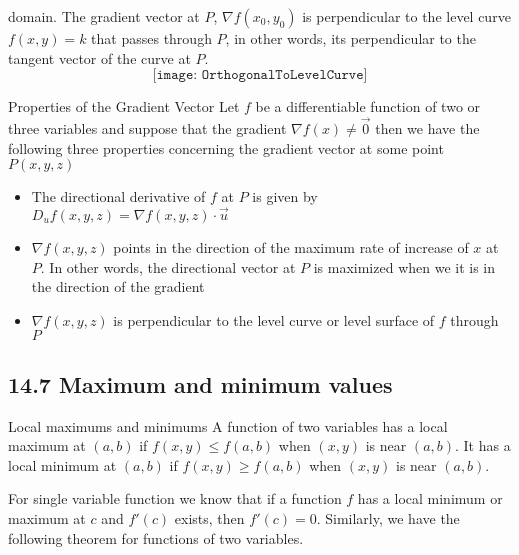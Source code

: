 \documentclass{article}
\begin{document}
	domain. The gradient vector at $P$, $\nabla f(x_{0},y_{0})$ is perpendicular to
	the level curve $f(x,y) = k$ that passes through $P$, in other words, its perpendicular
	to the tangent vector of the curve at $P$.
	\[
		\texttt{[image: OrthogonalToLevelCurve]}
	\]
	\pagebreak
	\begin{mybox}
		{Properties of the Gradient Vector} Let $f$ be a differentiable function of two
		or three variables and suppose that the gradient $\nabla f(x) \not = \vec{0}$
		then we have the following three properties concerning the gradient vector at
		some point $P(x,y,z)$
		\begin{itemize}
			\item The directional derivative of $f$ at $P$ is given by $D_{u}f(x,y,z)=
				\nabla f(x,y,z) \cdot \vec{u}$

			\item $\nabla f(x,y,z)$ points in the direction of the maximum rate of increase
				of $x$ at $P$. In other words, the directional vector at $P$ is maximized
				when we it is in the direction of the gradient

			\item $\nabla f(x,y,z)$ is perpendicular to the level curve or level surface
				of $f$ through $P$
		\end{itemize}
	\end{mybox}
	\subsection{14.7 Maximum and minimum values}
	\begin{mybox}
		{Local maximums and minimums} A function of two variables has a local maximum
		at $(a,b)$ if $f(x,y) \leq f(a,b)$ when $(x,y)$ is near $(a,b)$. It has a
		local minimum at $(a,b)$ if $f(x,y) \geq f(a,b)$ when $(x,y)$ is near
		$(a,b)$.
	\end{mybox}

	For single variable function we know that if a function $f$ has a local minimum
	or maximum at $c$ and $f'(c)$ exists, then $f'(c) = 0$. Similarly, we have the
	following theorem for functions of two variables.
\end{document}
